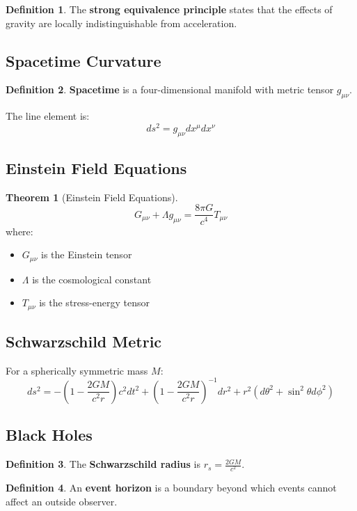 \documentclass[11pt]{article}
\theoremstyle{definition}
\newtheorem{definition}{Definition}[section]
\newtheorem{theorem}{Theorem}[section]
\begin{document}
\begin{definition}
The \textbf{strong equivalence principle} states that the effects of gravity are locally indistinguishable from acceleration.
\end{definition}

\subsection{Spacetime Curvature}
\begin{definition}
\textbf{Spacetime} is a four-dimensional manifold with metric tensor $g_{\mu\nu}$.
\end{definition}

The line element is:
$$ds^2 = g_{\mu\nu} dx^\mu dx^\nu$$

\subsection{Einstein Field Equations}
\begin{theorem}[Einstein Field Equations]
$$G_{\mu\nu} + \Lambda g_{\mu\nu} = \frac{8\pi G}{c^4} T_{\mu\nu}$$
where:
\begin{itemize}
    \item $G_{\mu\nu}$ is the Einstein tensor
    \item $\Lambda$ is the cosmological constant
    \item $T_{\mu\nu}$ is the stress-energy tensor
\end{itemize}
\end{theorem}

\subsection{Schwarzschild Metric}
For a spherically symmetric mass $M$:
$$ds^2 = -\left(1 - \frac{2GM}{c^2r}\right)c^2dt^2 + \left(1 - \frac{2GM}{c^2r}\right)^{-1}dr^2 + r^2(d\theta^2 + \sin^2\theta d\phi^2)$$

\subsection{Black Holes}
\begin{definition}
The \textbf{Schwarzschild radius} is $r_s = \frac{2GM}{c^2}$.
\end{definition}

\begin{definition}
An \textbf{event horizon} is a boundary beyond which events cannot affect an outside observer.
\end{definition}
\end{document}
